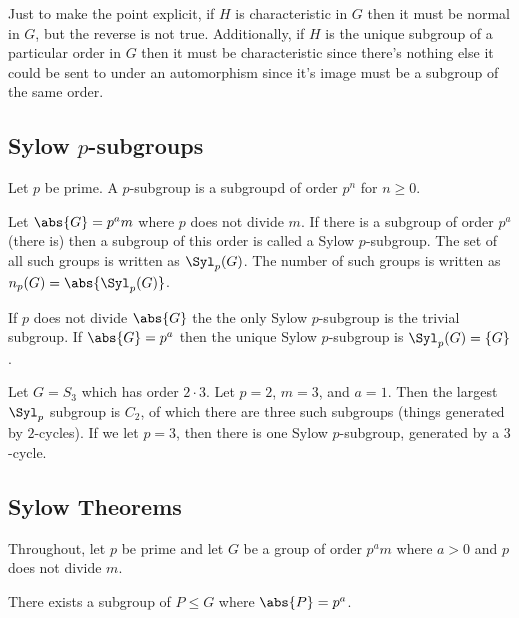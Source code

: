 Just to make the point explicit, if $H$ is characteristic in $G$ then it must be normal in $G$, but the reverse is not true. Additionally, if $H$ is the unique subgroup of a particular order in $G$ then it must be characteristic since there's nothing else it could be sent to under an automorphism since it's image must be a subgroup of the same order.

\subsection{Sylow \texorpdfstring{$p$}{p}-subgroups}

\begin{definition}
Let $p$ be prime. A $p$-subgroup is a subgroupd of order $p^n$ for $n \geq 0$.
\end{definition}

\begin{definition}
Let $\abs{G} = p^am$ where $p$ does not divide $m$. If there is a subgroup of order $p^a$ (there is) then a subgroup of this order is called a Sylow $p$-subgroup. The set of all such groups is written as $\Syl_p(G)$. The number of such groups is written as $n_p(G) = \abs{\Syl_p(G)}$.
\end{definition}

\begin{example}
If $p$ does not divide $\abs{G}$ the the only Sylow $p$-subgroup is the trivial subgroup. If $\abs{G} = p^a$ then the unique Sylow $p$-subgroup is $\Syl_p(G) = \{G\}$.
\end{example}

\begin{example}
Let $G = S_3$ which has order $2 \cdot 3$. Let $p = 2$, $m = 3$, and $a = 1$. Then the largest $\Syl_p$ subgroup is $C_2$, of which there are three such subgroups (things generated by $2$-cycles). If we let $p = 3$, then there is one Sylow $p$-subgroup, generated by a $3$-cycle.
\end{example}

\subsection{Sylow Theorems}

Throughout, let $p$ be prime and let $G$ be a group of order $p^am$ where $a > 0$ and $p$ does not divide $m$.

\begin{theorem}[Sylow I]
There exists a subgroup of $P \leq G$ where $\abs{P} = p^a$.
\end{theorem}

